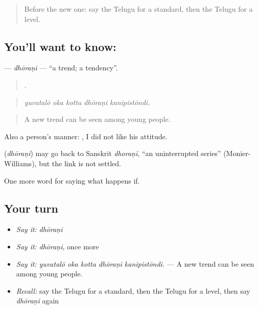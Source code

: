 \label{lesson:TE-C431-dhorani}



\begin{quote}
Before the new one: say the Telugu for a standard, then the Telugu for a level.
\end{quote}

\subsection*{You'll want to know: }
\textbf{} — \emph{dhōraṇi} — \textquotedblleft{}a trend; a tendency\textquotedblright{}.

\begin{quote}
    .
\end{quote}

\begin{quote}
\emph{yuvatalō oka kotta dhōraṇi kanipistōndi.}
\end{quote}

\begin{quote}
A new trend can be seen among young people.
\end{quote}

Also a person’s manner:    , I did not like his attitude.

\begin{cousinweb}
\textbf{} (\emph{dhōraṇi}) may go back to Sanskrit \emph{dhoraṇī}, \textquotedblleft{}an uninterrupted series\textquotedblright{} (Monier-Williams), but the link is not settled.
\end{cousinweb}

\begin{grammarlens}[title={What you've built}]
One more word for saying what happens if.
\end{grammarlens}

\subsection*{Your turn}
\begin{itemize}
\raggedright
  \item \emph{Say it:} \emph{dhōraṇi}
  \item \emph{Say it:} \emph{dhōraṇi}, once more
  \item \emph{Say it:} \emph{yuvatalō oka kotta dhōraṇi kanipistōndi.} — A new trend can be seen among young people.
  \item \emph{Recall:} say the Telugu for a standard, then the Telugu for a level, then say \emph{dhōraṇi} again
\end{itemize}

